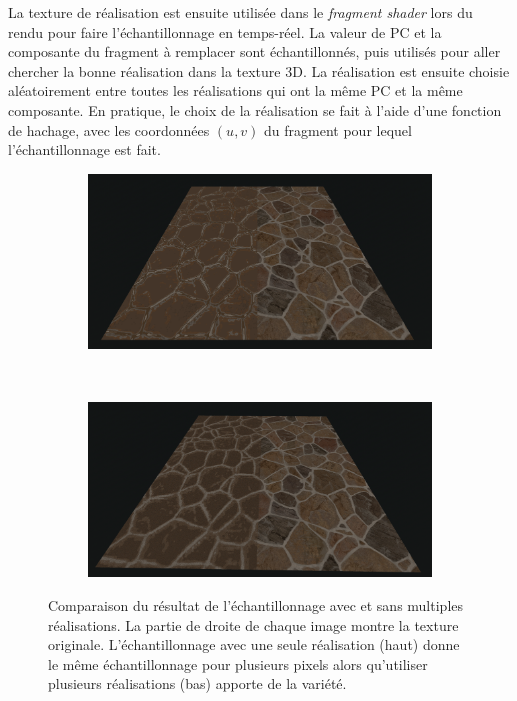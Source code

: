 La texture de réalisation est ensuite utilisée dans le \textit{fragment shader} lors du rendu pour faire l'échantillonnage en temps-réel. La valeur de PC et la composante du fragment à remplacer sont échantillonnés, puis utilisés pour aller chercher la bonne réalisation dans la texture 3D. La réalisation est ensuite choisie aléatoirement entre toutes les réalisations qui ont la même PC et la même composante. En pratique, le choix de la réalisation se fait à l'aide d'une fonction de hachage, avec les coordonnées $(u, v)$ du fragment pour lequel l'échantillonnage est fait.

\bigskip

\begin{figure}
    \centering
    \begin{subfigure}{.95\textwidth}
        \centering
        \includegraphics[width=\textwidth]{contenu/resources/images/partitioned_sampling_pc_preserving_no_shuffle}
    \end{subfigure}
    \\
    \begin{subfigure}{.95\textwidth}
        \centering
        \includegraphics[width=\textwidth]{contenu/resources/images/partitioned_sampling_pc_preserving_shuffle_uv}
    \end{subfigure}
    \caption[Échantillonnage avec et sans multiples réalisations]{Comparaison du résultat de l'échantillonnage avec et sans multiples réalisations. La partie de droite de chaque image montre la texture originale. L'échantillonnage avec une seule réalisation (haut) donne le même échantillonnage pour plusieurs pixels alors qu'utiliser plusieurs réalisations (bas) apporte de la variété.}
    \label{fig:offset-shuffle}
\end{figure}

